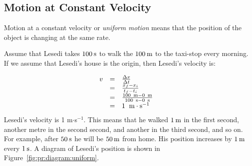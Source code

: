             \subsection*{Motion at Constant Velocity}
            \nopagebreak
        \label{m38795*id69835}Motion at a constant velocity or \textsl{uniform motion} means that the position of the object is changing at the same rate.\par 
        \label{m38795*id69845}Assume that Lesedi takes $100\phantom{\rule{2pt}{0ex}}\text{s}$ to walk the $100\phantom{\rule{2pt}{0ex}}\text{m}$ to the taxi-stop every morning. If we assume that Lesedi's house is the origin, then Lesedi's velocity is:\par 
        \label{m38795*id69850}\nopagebreak\noindent{}
          
    \begin{equation*}
    \begin{array}{ccc}\hfill v& =& \frac{\Delta x}{\Delta t}\hfill \\ & =& \frac{{x}_{f}-{x}_{i}}{{t}_{f}-{t}_{i}}\hfill \\ & =& \frac{100\phantom{\rule{4pt}{0ex}}\text{m}-0\phantom{\rule{4pt}{0ex}}\text{m}}{100\phantom{\rule{4pt}{0ex}}\text{s}-0\phantom{\rule{4pt}{0ex}}\text{s}}\hfill \\ & =& 1\phantom{\rule{4pt}{0ex}}\phantom{\rule{0.166667em}{0ex}}\text{m}\ensuremath{\cdot}{\text{s}}^{-1}\hfill \end{array}
      \end{equation*}
        \label{m38795*id70029}Lesedi's velocity is 1 m$\ensuremath{\cdot}$s${}^{-1}$. This means that he walked $1\phantom{\rule{2pt}{0ex}}\text{m}$ in the first second, another metre in the second second, and another in the third second, and so on. For example, after $50\phantom{\rule{2pt}{0ex}}\text{s}$ he will be $50\phantom{\rule{2pt}{0ex}}\text{m}$ from home. His position increases by $1\phantom{\rule{2pt}{0ex}}\text{m}$ every $1\phantom{\rule{2pt}{0ex}}\text{s}$. A diagram of Lesedi's position is shown in Figure~\ref{fig:pr:diagram:uniform}.\par 
    \setcounter{subfigure}{0}

